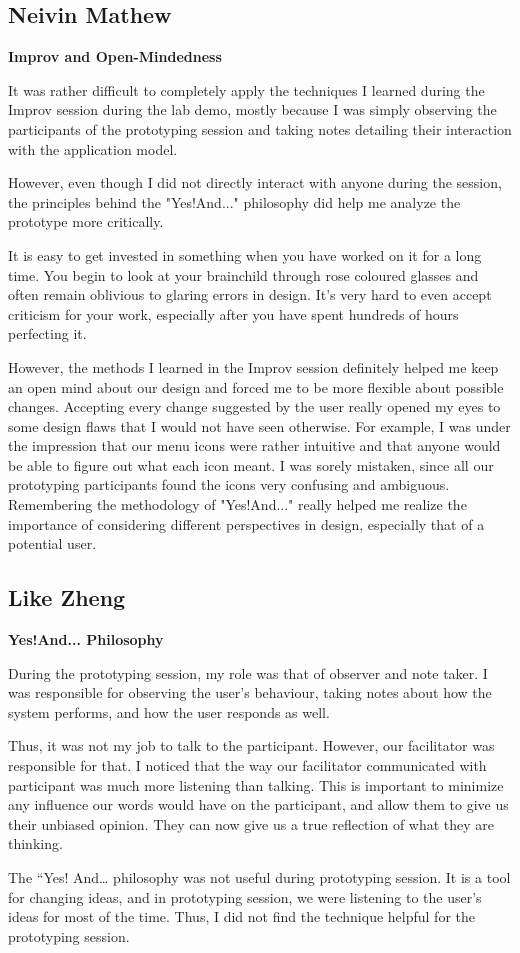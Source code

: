 \documentclass[12pt,letterpaper]{article}
\begin{document}
\clearpage
\subsection{Neivin Mathew}
\textbf{Improv and Open-Mindedness}\par
It was rather difficult to completely apply the techniques I learned during the Improv session during the lab demo, mostly because I was simply observing the participants of the prototyping session and taking notes detailing their interaction with the application model.\par
However, even though I did not directly interact with anyone during the session, the principles behind the "Yes!And..." philosophy did help me analyze the prototype more critically.\par 
It is easy to get invested in something when you have worked on it for a long time. You begin to look at your brainchild through rose coloured glasses and often remain oblivious to glaring errors in design. It's very hard to even accept criticism for your work, especially after you have spent hundreds of hours perfecting it. \par
However, the methods I learned in the Improv session definitely helped me keep an open mind about our design and forced me to be more flexible about possible changes. Accepting every change suggested by the user really opened my eyes to some design flaws that I would not have seen otherwise. For example, I was under the impression that our menu icons were rather intuitive and that anyone would be able to figure out what each icon meant. I was sorely mistaken, since all our prototyping participants found the icons very confusing and ambiguous. Remembering the methodology of "Yes!And..." really helped me realize the importance of considering different perspectives in design, especially that of a potential user. 

		
	
\clearpage
\subsection{Like Zheng}
\textbf{Yes!And... Philosophy}\par
During the prototyping session, my role was that of observer and note taker. I was responsible for observing the user's behaviour, taking notes about how the system performs, and how the user responds as well.\par
Thus, it was not my job to talk to the participant. However, our facilitator was responsible for that. I noticed that the way our facilitator communicated with participant was much more listening than talking. This is important to minimize any influence our words would have on the participant, and allow them to give us their unbiased opinion. They can now give us a true reflection of what they are thinking.\par 
The “Yes! And… philosophy was not useful during prototyping session. It is a tool for changing ideas, and in prototyping session, we were listening to the user's ideas for most of the time. Thus, I did not find the technique helpful for the prototyping session. 
\end{document}
